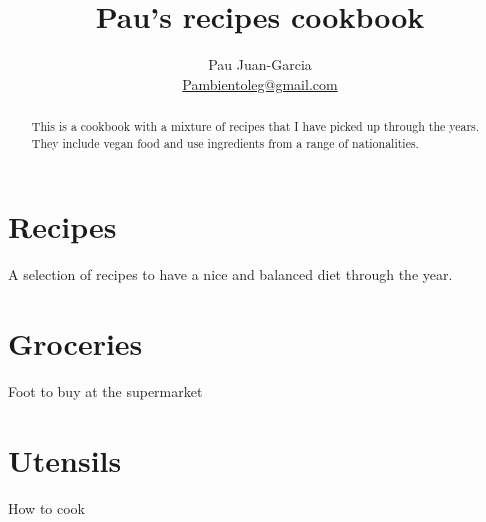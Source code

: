 \documentclass[%
a4paper,
11pt
]{article}
\begin{document}
\title{Pau's recipes cookbook}
\author{Pau Juan-Garcia\\ \href{mailto:Pambientoleg@gmail.com}{Pambientoleg@gmail.com}}
\maketitle

\begin{abstract}
    \noindent This is a cookbook with a mixture of recipes that I have picked up through the years. They include vegan food and use ingredients from a range of nationalities.
\end{abstract}

\tableofcontents

\vspace{5em}

\section{Recipes}
A selection of recipes to have a nice and balanced diet through the year.



%
%
%
%
%
%
%
%
%
%
%
%
%
%
%
%
%
%
%
%
%
%
%
%
%
%
%
%
%
%
%
%
%
%
%
%
%
%
%

\section{Groceries}
Foot to buy at the supermarket

\section{Utensils}
How to cook
\end{document}
